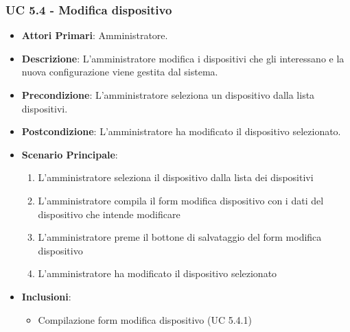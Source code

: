 			\subsubsection{UC 5.4 - Modifica dispositivo}
			\begin{itemize}
				\item \textbf{Attori Primari}: Amministratore.
				\item \textbf{Descrizione}: L'amministratore modifica i dispositivi che gli interessano e la nuova configurazione viene gestita dal sistema.
				\item \textbf{Precondizione}: L'amministratore seleziona un dispositivo dalla lista dispositivi.
				\item \textbf{Postcondizione}: L'amministratore ha modificato il dispositivo selezionato.
				\item \textbf{Scenario Principale}:
				\begin{enumerate}
					\item{L'amministratore seleziona il dispositivo dalla lista dei dispositivi}
					\item{L'amministratore compila il form modifica dispositivo con i dati del dispositivo che intende modificare}
					\item{L'amministratore preme il bottone di salvataggio del form modifica dispositivo}
					\item{L'amministratore ha modificato il dispositivo selezionato}
				\end{enumerate}
				\item \textbf{Inclusioni}:
				\begin{itemize}
					\item Compilazione form modifica dispositivo (UC 5.4.1)
				\end{itemize}
			\end{itemize}

			
